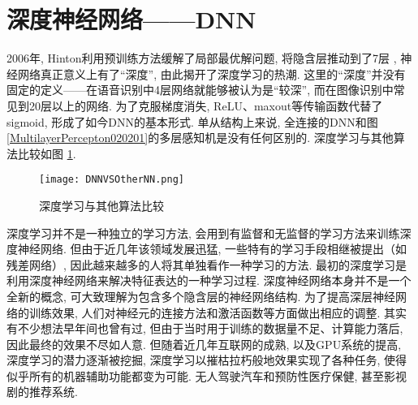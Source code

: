 \section{深度神经网络——DNN}
2006年, Hinton利用预训练方法缓解了局部最优解问题, 将隐含层推动到了7层 \cite{Hinton2006-9587}, 神经网络真正意义上有了“深度”, 由此揭开了深度学习的热潮. 这里的“深度”并没有固定的定义——在语音识别中4层网络就能够被认为是“较深”, 而在图像识别中常见到20层以上的网络. 为了克服梯度消失, ReLU、maxout等传输函数代替了sigmoid, 形成了如今DNN的基本形式. 单从结构上来说, 全连接的DNN和图 \ref{MultilayerPercepton020201}的多层感知机是没有任何区别的. 深度学习与其他算法比较如图 \ref{DNNVSOtherNN}.
\begin{figure}[htbp]
\vspace{-0.4cm}
    \centering
    \texttt{[image: DNNVSOtherNN.png]}
    \caption{深度学习与其他算法比较}
    \label{DNNVSOtherNN}
\end{figure}
深度学习并不是一种独立的学习方法, 会用到有监督和无监督的学习方法来训练深度神经网络.
但由于近几年该领域发展迅猛, 一些特有的学习手段相继被提出（如残差网络）, 因此越来越多的人将其单独看作一种学习的方法.
最初的深度学习是利用深度神经网络来解决特征表达的一种学习过程.
深度神经网络本身并不是一个全新的概念, 可大致理解为包含多个隐含层的神经网络结构. 为了提高深层神经网络的训练效果, 人们对神经元的连接方法和激活函数等方面做出相应的调整.
其实有不少想法早年间也曾有过, 但由于当时用于训练的数据量不足、计算能力落后, 因此最终的效果不尽如人意.
但随着近几年互联网的成熟, 以及GPU系统的提高, 深度学习的潜力逐渐被挖掘, 深度学习以摧枯拉朽般地效果实现了各种任务, 使得似乎所有的机器辅助功能都变为可能.
无人驾驶汽车和预防性医疗保健, 甚至影视剧的推荐系统.

